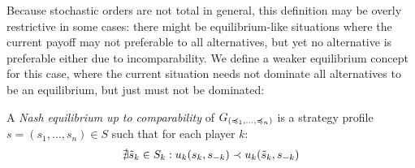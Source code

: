 \documentclass[a4paper]{scrreprt}
\begin{document}
    Because stochastic orders are not total in general, this definition may be overly restrictive in some cases: there might be equilibrium-like situations where the current payoff may not preferable to all alternatives, but yet no alternative is preferable either due to incomparability. We define a weaker equilibrium concept for this case, where the current situation needs not dominate all alternatives to be an equilibrium, but just must not be dominated:
    \begin{defn}
        A \emph{Nash equilibrium up to comparability} of $G_{(\preccurlyeq_1, \dots, \preccurlyeq_n)}$
        is a strategy profile $s = (s_1, \dots, s_n) \in S$ such that for each player $k$:
        \begin{gather}
            \nexists \tilde{s}_k \in S_k: u_k(s_k, s_{-k}) \dstrnonpref u_k(\tilde{s}_k, s_{-k})
        \end{gather}
    \end{defn}
\end{document}
